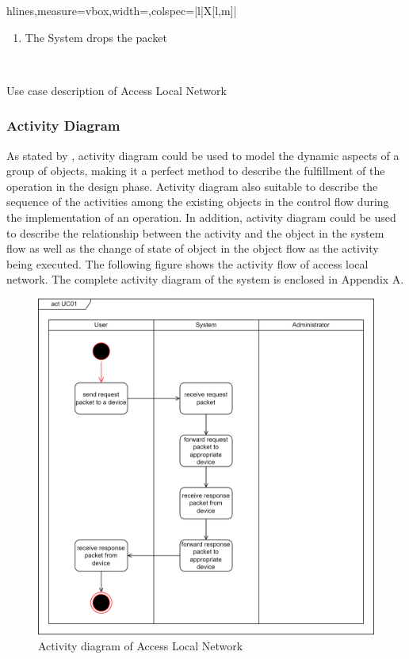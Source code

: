 \documentclass[../index.tex]{subfiles}
\begin{document}
\begin{table}[H]
\begin{tblr}{hlines,measure=vbox,width=\textwidth,colspec={|l|X[l,m]|}}
\begin{enumerate}
\begin{enumerate}
            \item The System drops the packet
          \end{enumerate}
    \end{enumerate} \\
  \end{tblr}
  \caption{Use case description of Access Local Network}
  \label{table:use_case_1}
\end{table}

\subsubsection{Activity Diagram}

As stated by \cite{10.1109/APSEC.2004.55}, activity diagram could be used to model the dynamic
aspects of a group of objects, making it a perfect method to describe the fulfillment of the
operation in the design phase. Activity diagram also suitable to describe the sequence of the
activities among the existing objects in the control flow during the implementation of an operation.
In addition, activity diagram could be used to describe the relationship between the activity and
the object in the system flow as well as the change of state of object in the object flow as the
activity being executed. The following figure shows the activity flow of access local network. The
complete activity diagram of the system is enclosed in Appendix A.

\begin{figure}[h]
  \includegraphics[width=\textwidth]{../assets/activity_diagram.drawio.png}
  \caption{Activity diagram of Access Local Network}
  \label{fig:activity_diagram_1}
\end{figure}
\end{document}
